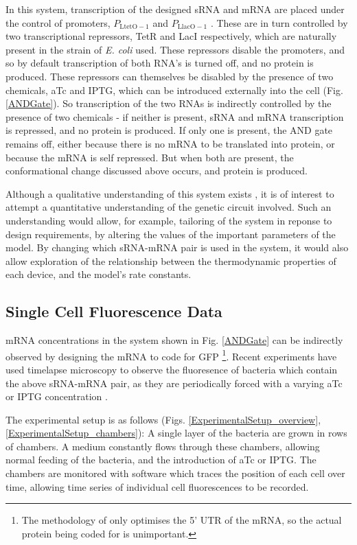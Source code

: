 \documentclass[10pt,journal]{./IEEE_latex_class/IEEEtran}
\begin{document}
In this system, transcription of the designed sRNA and mRNA are placed under the control of promoters, $P_{\mathrm{LtetO-1}}$ and $P_\mathrm{LlacO-1}$ \cite{Lutz1997}. These are in turn controlled by two transcriptional repressors, TetR and LacI respectively, which are naturally present in the strain of \textit{E. coli} used. These repressors disable the promoters, and so by default transcription of both RNA's is turned off, and no protein is produced. 
These repressors can themselves be disabled by the presence of two chemicals, aTc and IPTG, which can be introduced externally into the cell (Fig. \ref{ANDGate}).  So transcription of the two RNAs is indirectly controlled by the presence of two chemicals - if neither is present, sRNA and mRNA transcription is repressed, and no protein is produced. If only one is present, the AND gate remains off, either because there is no mRNA to be translated into protein, or because the mRNA is self repressed. But when both are present, the conformational change discussed above occurs, and protein is produced.

Although a qualitative understanding of this system exists \cite{Rodrigo2012}, it is of interest to attempt a quantitative understanding of the genetic circuit involved. Such an understanding would allow, for example, tailoring of the system in reponse to design requirements, by altering the values of the important parameters of the model. By changing which sRNA-mRNA pair is used in the system, it would also allow exploration of the relationship between the thermodynamic properties of each device, and the model's rate constants.
 
\subsection{Single Cell Fluorescence Data}

mRNA concentrations in the system shown in Fig. \ref{ANDGate} can be indirectly observed by designing the mRNA to code for GFP \footnote{ The methodology of \cite{Rodrigo2012} only optimises the 5' UTR of the mRNA, so the actual protein being coded for is unimportant.}. Recent experiments have used timelapse microscopy to observe the fluoresence of bacteria which contain the above sRNA-mRNA pair, as they are periodically forced with a varying aTc or IPTG concentration \cite{Jaramillo}. 

The experimental setup is as follows (Figs. \ref{ExperimentalSetup_overview},  \ref{ExperimentalSetup_chambers}): A single layer of the bacteria are grown in rows of chambers. A medium constantly flows through these chambers, allowing normal feeding of the bacteria, and the introduction of aTc or IPTG. The chambers are monitored with software which traces the position of each cell over time, allowing time series of individual cell fluorescences to be recorded.
\end{document}
